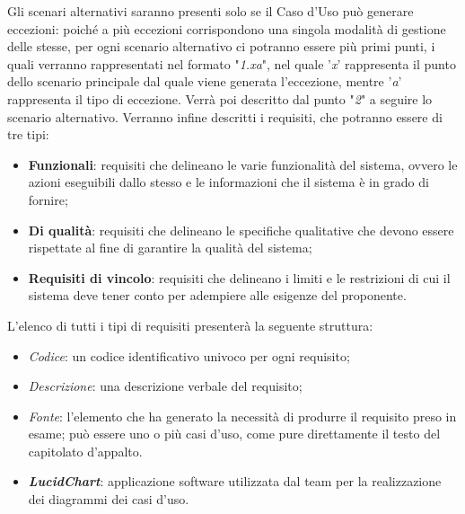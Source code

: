 \begin{comment}
I sottocasi d'uso non verranno descritti individualmente, poiché sarà già tutto descritto a livello atomico nello Scenario principale del relativo Caso d'Uso "padre".
\end{comment}
Gli scenari alternativi saranno presenti solo se il Caso d'Uso può generare eccezioni: poiché a più eccezioni corrispondono una singola modalità di gestione delle stesse, per ogni scenario alternativo ci potranno essere più primi punti, i quali verranno rappresentati nel formato "\textit{1.xa}", nel quale '\textit{x}' rappresenta il punto dello scenario principale dal quale viene generata l'eccezione, mentre '\textit{a}' rappresenta il tipo di eccezione. Verrà poi descritto dal punto "\textit{2}" a seguire lo scenario alternativo.
Verranno infine descritti i requisiti, che potranno essere di tre tipi: 
\begin{itemize}
    \item \textbf{Funzionali}: requisiti che delineano le varie funzionalità del sistema, ovvero le azioni eseguibili dallo stesso e le informazioni che il sistema è in grado di fornire; 
    \item \textbf{Di qualità}: requisiti che delineano le specifiche qualitative che devono essere rispettate al fine di garantire la qualità del sistema; 
    \item \textbf{Requisiti di vincolo}: requisiti che delineano i limiti e le restrizioni di cui il sistema deve tener conto per adempiere alle esigenze del proponente. 
\end{itemize}
L'elenco di tutti i tipi di requisiti presenterà la seguente struttura: 
\begin{itemize}
    \item \textit{Codice}: un codice identificativo univoco per ogni requisito; 
    \item \textit{Descrizione}: una descrizione verbale del requisito; 
    \item \textit{Fonte}: l'elemento che ha generato la necessità di produrre il requisito preso in esame; può essere uno o più casi d'uso, come pure direttamente il testo del capitolato d'appalto. 
\end{itemize}
\begin{itemize}
    \item \emph{\textbf{LucidChart}}: applicazione software utilizzata dal team per la realizzazione dei diagrammi dei casi d'uso.
\end{itemize}
